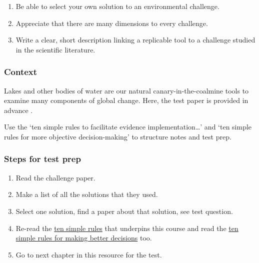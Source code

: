 \documentclass[
]{book}
\providecommand{\tightlist}{%
  \setlength{\itemsep}{0pt}\setlength{\parskip}{0pt}}
\begin{document}
\begin{enumerate}
\def\labelenumi{\arabic{enumi}.}
\tightlist
\item
  Be able to select your own solution to an environmental challenge.
\item
  Appreciate that there are many dimensions to every challenge.\\
\item
  Write a clear, short description linking a replicable tool to a challenge studied in the scientific literature.
\end{enumerate}

\hypertarget{context-4}{%
\subsubsection*{Context}\label{context-4}}

Lakes and other bodies of water are our natural canary-in-the-coalmine tools to examine many components of global change. Here, the test paper is provided in advance \citep{RN6387}.

Use the `ten simple rules to facilitate evidence implementation\ldots{}' \citep{RN6861} and `ten simple rules for more objective decision-making' \citep{RN7223} to structure notes and test prep.

\hypertarget{steps-for-test-prep}{%
\subsubsection*{Steps for test prep}\label{steps-for-test-prep}}

\begin{enumerate}
\def\labelenumi{\arabic{enumi}.}
\tightlist
\item
  Read the challenge paper.\\
\item
  Make a list of all the solutions that they used.
\item
  Select one solution, find a paper about that solution, see test question.\\
\item
  Re-read the \href{https://www.facetsjournal.com/doi/10.1139/facets-2020-0021}{ten simple rules} that underpins this course and read the \href{https://journals.plos.org/ploscompbiol/article?id=10.1371/journal.pcbi.1007706}{ten simple rules for making better decisions} too.
\item
  Go to next chapter in this resource for the test.
\end{enumerate}
\end{document}

